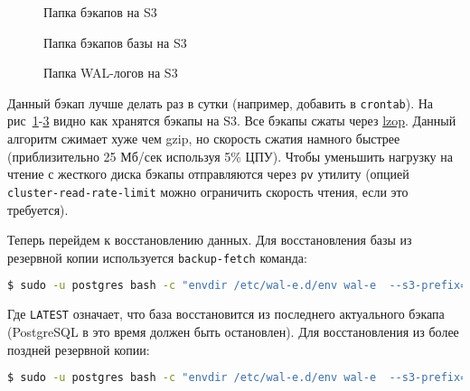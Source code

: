 \begin{figure}[h!]
  \caption{Папка бэкапов на S3}
  \label{fig:wal-e1}
\end{figure}

\begin{figure}[h!]
  \caption{Папка бэкапов базы на S3}
  \label{fig:wal-e2}
\end{figure}

\begin{figure}[h!]
  \caption{Папка WAL-логов на S3}
  \label{fig:wal-e3}
\end{figure}

Данный бэкап лучше делать раз в сутки (например, добавить в \lstinline!crontab!). На рис~\ref{fig:wal-e1}-\ref{fig:wal-e3} видно как хранятся бэкапы на S3. Все бэкапы сжаты через \href{http://en.wikipedia.org/wiki/Lzop}{lzop}. Данный алгоритм сжимает хуже чем gzip, но скорость сжатия намного быстрее (приблизительно 25 Мб/сек используя 5\% ЦПУ). Чтобы уменьшить нагрузку на чтение с жесткого диска бэкапы отправляются через \lstinline!pv! утилиту (опцией \lstinline!cluster-read-rate-limit! можно ограничить скорость чтения, если это требуется).

Теперь перейдем к восстановлению данных. Для восстановления базы из резервной копии используется \lstinline!backup-fetch! команда:

\begin{lstlisting}[language=Bash,label=lst:wal-e10,caption=Восстановление бэкапа базы из S3]
$ sudo -u postgres bash -c "envdir /etc/wal-e.d/env wal-e  --s3-prefix=s3://some-bucket/directory/or/whatever backup-fetch /var/lib/postgresql/9.2/main LATEST"
\end{lstlisting}

Где \lstinline!LATEST! означает, что база восстановится из последнего актуального бэкапа (PostgreSQL в это время должен быть остановлен). Для восстановления из более поздней резервной копии:

\begin{lstlisting}[language=Bash,label=lst:wal-e11,caption=Восстановление из поздней резервной копии]
$ sudo -u postgres bash -c "envdir /etc/wal-e.d/env wal-e  --s3-prefix=s3://some-bucket/directory/or/whatever backup-fetch /var/lib/postgresql/9.2/main base_LONGWALNUMBER_POSITION_NUMBER"
\end{lstlisting}

